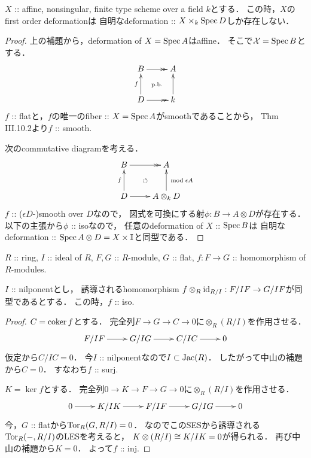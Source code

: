 \documentclass[a4paper]{jsarticle}
\makeatletter
\newcommand{\dualnum}{\mathbb{I}}
\newcommand{\centerpb}{\ar@{}[lu]|{\text{p.b.}}}
\newcommand{\defX}{\mathcal{X}}
\makeatother
\begin{document}
    \begin{Lemma}\label{thm:aff_is_rigid}
        $X$ :: affine, nonsingular, finite type scheme over a field $k$とする．
        この時，$X$のfirst order deformationは
        自明なdeformation :: $X \times_k \Spec D$しか存在しない．
    \end{Lemma}
    \begin{proof}
        上の補題から，deformation of $X=\Spec A$はaffine．
        そこで$\defX=\Spec B$とする．
        \[\vcenter{\xymatrix{
            B \ar@{->>}[r]& A \\
            D \ar@{->>}[r] \ar[u]^-{f}& k \ar[u]
            \centerpb
        }}\]
        $f$ :: flatと，$f$の唯一のfiber :: $X=\Spec A$がsmoothであることから，
        \cite{HarAG} Thm III.10.2より$f$ :: smooth.

        次のcommutative diagramを考える．
        \[\vcenter{\xymatrix{
            B \ar@{->>}[r]& A \\
            D \ar@{->}[r] \ar[u]^-{f}& A \otimes_{k} D \ar[u]_-{\bmod \epsilon A}
            \ar@{}[lu]|{\circlearrowleft}
        }}\]
        $f$ :: ($\epsilon D$-)smooth over $D$なので，
        図式を可換にする射$\phi: B \to A \otimes D$が存在する．
        以下の主張から$\phi$ :: isoなので，
        任意のdeformation of $X$ :: $\Spec B$は
        自明なdeformation :: $\Spec A \otimes D=X \times \dualnum$と同型である．
    \end{proof}

    \begin{Claim}
        $R$ :: ring,
        $I$ :: ideal of $R$,
        $F, G$ :: $R$-module, $G$ :: flat,
        $f: F \to G$ :: homomorphism of $R$-modules.

        $I$ :: nilponentとし，
        誘導されるhomomorphism
        $f \otimes_{R} \id[R/I]: F/IF \to G/IF$が同型であるとする．
        この時，$f$ :: iso.
    \end{Claim}
    \begin{proof}
        $C=\coker f$とする．
        完全列$F \to G \to C \to 0$に$\otimes_{R} (R/I)$を作用させる．
        \[\xymatrix{
            F/IF \ar[r]& G/IG \ar[r]& C/IC \ar[r]& 0
        }\]
        仮定から$C/IC=0$．
        今$I$ :: nilponentなので$I \subset \Jac(R)$．
        したがって中山の補題から$C=0$．
        すなわち$f$ :: surj.

        $K=\ker f$とする．
        完全列$0 \to K \to F \to G \to 0$に$\otimes_{R} (R/I)$を作用させる．
        \[\xymatrix{
                0 \ar[r]& K/IK \ar[r]& F/IF \ar[r]& G/IG \ar[r]& 0
        }\]
        今，$G$ :: flatから$\Tor_{R}(G, R/I)=0$．
        なのでこのSESから誘導される$\Tor_{R}(-, R/I)$のLESを考えると，
        $K \otimes(R/I) \iso K/IK=0$が得られる．
        再び中山の補題から$K=0$．
        よって$f$ :: inj.
    \end{proof}
\end{document}
